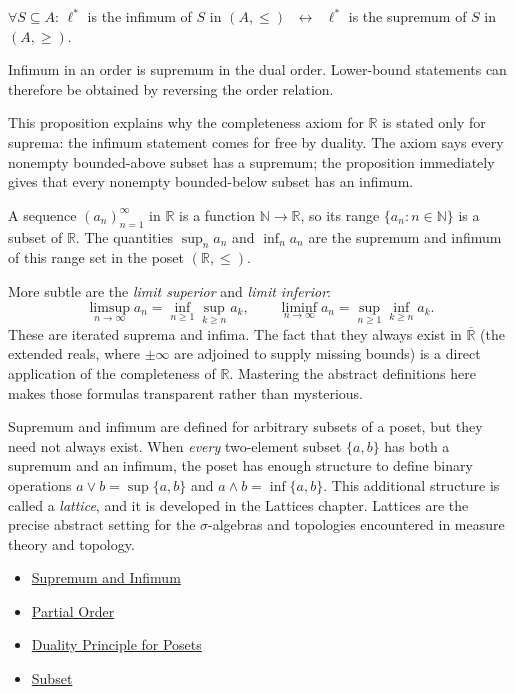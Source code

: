 \begin{remark*}
$\forall S \subseteq A$: $\ell^*$ is the infimum of $S$ in $(A,\leq)$
$\;\leftrightarrow\;$ $\ell^*$ is the supremum of $S$ in $(A,\geq)$.
\end{remark*}

\begin{remark*}[Interpretation]
Infimum in an order is supremum in the dual order. Lower-bound statements can
therefore be obtained by reversing the order relation.
\end{remark*}

\begin{remark*}[Exposition]
This proposition explains why the completeness axiom for $\mathbb{R}$ is
stated only for suprema: the infimum statement comes for free by duality.
The axiom says every nonempty bounded-above subset has a supremum; the
proposition immediately gives that every nonempty bounded-below subset has
an infimum.
\end{remark*}


\begin{remark*}[Exposition]
A sequence $(a_n)_{n=1}^{\infty}$ in $\mathbb{R}$ is a function
$\mathbb{N} \to \mathbb{R}$, so its range $\{a_n : n \in \mathbb{N}\}$ is a
subset of $\mathbb{R}$.  The quantities $\sup_n a_n$ and $\inf_n a_n$ are
the supremum and infimum of this range set in the poset $(\mathbb{R}, \leq)$.

More subtle are the \emph{limit superior} and \emph{limit inferior}:
\[
  \limsup_{n\to\infty} a_n = \inf_{n \geq 1} \sup_{k \geq n} a_k,
  \qquad
  \liminf_{n\to\infty} a_n = \sup_{n \geq 1} \inf_{k \geq n} a_k.
\]
These are iterated suprema and infima.  The fact that they always exist in
$\overline{\mathbb{R}}$ (the extended reals, where $\pm\infty$ are adjoined
to supply missing bounds) is a direct application of the completeness of
$\mathbb{R}$.  Mastering the abstract definitions here makes those formulas
transparent rather than mysterious.
\end{remark*}

\begin{remark*}[Exposition]
Supremum and infimum are defined for arbitrary subsets of a poset, but they
need not always exist.  When \emph{every} two-element subset $\{a,b\}$ has
both a supremum and an infimum, the poset has enough structure to define
binary operations $a \vee b = \sup\{a,b\}$ and $a \wedge b = \inf\{a,b\}$.
This additional structure is called a \emph{lattice}, and it is developed in
the Lattices chapter.  Lattices are the precise abstract setting for the
$\sigma$-algebras and topologies encountered in measure theory and topology.
\end{remark*}

\begin{dependencies}
\begin{itemize}
  \item \hyperref[def:sup-inf]{Supremum and Infimum}
  \item \hyperref[def:partial-order]{Partial Order}
  \item \hyperref[prop:order-duality]{Duality Principle for Posets}
  \item \hyperref[def:subset]{Subset}
\end{itemize}
\end{dependencies}
